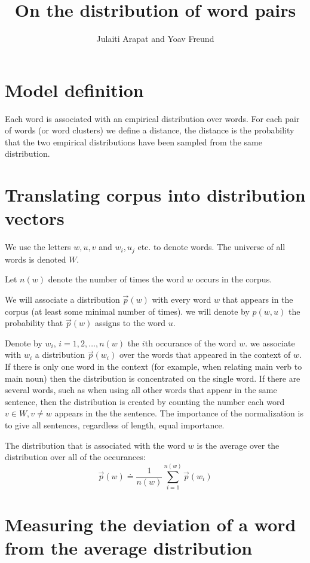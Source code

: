 \documentclass{article}
\title{On the distribution of word pairs}
\author{Julaiti Arapat and Yoav Freund}
\begin{document}
\maketitle

\section{Model definition}

Each word is associated with an empirical distribution over words. For each pair
of words (or word clusters) we define a distance, the distance is the
probability that the two empirical distributions have been sampled
from the same distribution.

\section{Translating corpus into distribution vectors}

We use the letters $w,u,v$ and $w_i,u_j$ etc. to denote words. The
universe of all words is denoted $W$.

\newcommand{\vw}{\vec{w}}
\newcommand{\vu}{\vec{u}}
\newcommand{\vp}{\vec{p}}
\newcommand{\vq}{\vec{q}}

Let $n(w)$ denote the number of times the word $w$ occurs in the
corpus.

We will associate a distribution $\vp(w)$ with every word $w$ that
appears in the corpus (at least some minimal number of times). we will
denote by $p(w,u)$ the probability that $\vp(w)$ assigns to the word $u$.

Denote by $w_i$, $i=1,2,\ldots,n(w)$ the $i$th occurance of the word $w$. we associate with
$w_i$ a distribution  $\vp(w_i)$ over the words that appeared in the context of
$w$. If there is only one word in the context (for example, when
relating main verb to main noun) then the distribution is concentrated
on the single word. If there are several words, such as when using all
other words that appear in the same sentence, then the distribution
is created by counting the number each word $v\in W, v \neq w$ appears in the
the sentence.  The importance of the normalization is to give all
sentences, regardless of length, equal importance.


The distribution that is associated with the word $w$ is the average
over the distribution over all of the occurances:
\[
\vp(w) \doteq \frac{1}{n(w)} \sum_{i=1}^{n(w)} \vp(w_i)
\]

\section{Measuring the deviation of a word from the average
  distribution}
\end{document}

